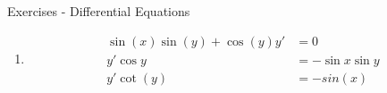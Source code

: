 \documentclass{article}
\begin{document}
    \huge Exercises - Differential Equations
    \normalsize

\begin{enumerate} 
\item  \begin{align*} 
\sin(x)\sin(y)+\cos(y)y'&=0\\
y'\cos y  &= -\sin x\sin y\\
y'\cot(y)&= -sin(x)
\end{align*}

\end{enumerate}
\end{document}
